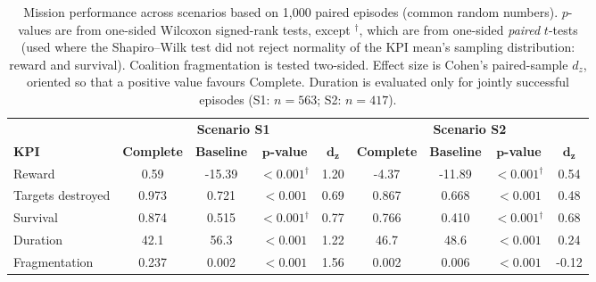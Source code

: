 \begin{table}[htbp]
    \centering
    \caption{Mission performance across scenarios based on 1,000 paired episodes (common random numbers). \(p\)-values are from one-sided Wilcoxon signed-rank tests, except \(^{\dagger}\), which are from one-sided \emph{paired} \(t\)-tests (used where the Shapiro--Wilk test did not reject normality of the KPI mean's sampling distribution: reward and survival). Coalition fragmentation is tested two-sided. Effect size is Cohen's paired-sample \(d_z\), oriented so that a positive value favours Complete. Duration is evaluated only for jointly successful episodes (S1: \(n=563\); S2: \(n=417\)).}
    \label{tab:mission-performance}
    \small
    \begin{tabular}{lcccccccc}
        \toprule
        & \multicolumn{4}{c}{\textbf{Scenario S1}}
        & \multicolumn{4}{c}{\textbf{Scenario S2}} \\
        \cmidrule(lr){2-5}
        \cmidrule(lr){6-9}

        \textbf{KPI}
        & \textbf{Complete}
        & \textbf{Baseline}
        & \(\boldsymbol{p}\)\textbf{-value}
        & \(\boldsymbol{d_z}\)
        & \textbf{Complete}
        & \textbf{Baseline}
        & \(\boldsymbol{p}\)\textbf{-value}
        & \(\boldsymbol{d_z}\) \\
        \midrule

        Reward
        & 0.59 & -15.39 & \(<0.001\)\(^{\dagger}\) & 1.20
        & -4.37 & -11.89 & \(<0.001\)\(^{\dagger}\) & 0.54 \\

        Targets destroyed
        & 0.973 & 0.721 & \(<0.001\) & 0.69
        & 0.867 & 0.668 & \(<0.001\) & 0.48 \\

        Survival
        & 0.874 & 0.515 & \(<0.001\)\(^{\dagger}\) & 0.77
        & 0.766 & 0.410 & \(<0.001\)\(^{\dagger}\) & 0.68 \\

        Duration
        & 42.1 & 56.3 & \(<0.001\) & 1.22
        & 46.7 & 48.6 & \(<0.001\) & 0.24 \\

        Fragmentation
        & 0.237 & 0.002 & \(<0.001\) & 1.56
        & 0.002 & 0.006 & \(<0.001\) & -0.12 \\
        \bottomrule
    \end{tabular}
\end{table}
